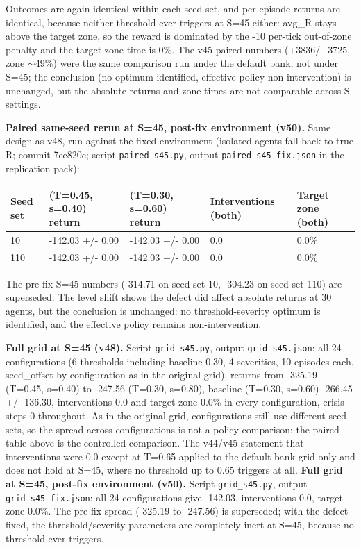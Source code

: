 \documentclass[11pt]{article}
\begin{document}
Outcomes are again identical within each seed set, and per-episode returns are identical, because neither threshold ever triggers at S=45 either: avg\_R stays above the target zone, so the reward is dominated by the -10 per-tick out-of-zone penalty and the target-zone time is 0\%. The v45 paired numbers (+3836/+3725, zone $\sim$49\%) were the same comparison run under the default bank, not under S=45; the conclusion (no optimum identified, effective policy non-intervention) is unchanged, but the absolute returns and zone times are not comparable across S settings.

\textbf{Paired same-seed rerun at S=45, post-fix environment (v50).} Same design as v48, run against the fixed environment (isolated agents fall back to true R; commit 7ee820c; script \texttt{paired\_s45.py}, output \texttt{paired\_s45\_fix.json} in the replication pack):

\begin{table}[htbp]
\centering
\begin{tabular}{lllll}
\toprule
\textbf{Seed set} & \textbf{(T=0.45, s=0.40) return} & \textbf{(T=0.30, s=0.60) return} & \textbf{Interventions (both)} & \textbf{Target zone (both)} \\
\midrule
10 & -142.03 +/- 0.00 & -142.03 +/- 0.00 & 0.0 & 0.0\% \\
110 & -142.03 +/- 0.00 & -142.03 +/- 0.00 & 0.0 & 0.0\% \\
\bottomrule
\end{tabular}
\end{table}

The pre-fix S=45 numbers (-314.71 on seed set 10, -304.23 on seed set 110) are superseded. The level shift shows the defect did affect absolute returns at 30 agents, but the conclusion is unchanged: no threshold-severity optimum is identified, and the effective policy remains non-intervention.

\textbf{Full grid at S=45 (v48).} Script \texttt{grid\_s45.py}, output \texttt{grid\_s45.json}: all 24 configurations (6 thresholds including baseline 0.30, 4 severities, 10 episodes each, seed\_offset by configuration as in the original grid), returns from -325.19 (T=0.45, s=0.40) to -247.56 (T=0.30, s=0.80), baseline (T=0.30, s=0.60) -266.45 +/- 136.30, interventions 0.0 and target zone 0.0\% in every configuration, crisis steps 0 throughout. As in the original grid, configurations still use different seed sets, so the spread across configurations is not a policy comparison; the paired table above is the controlled comparison. The v44/v45 statement that interventions were 0.0 except at T=0.65 applied to the default-bank grid only and does not hold at S=45, where no threshold up to 0.65 triggers at all. \textbf{Full grid at S=45, post-fix environment (v50).} Script \texttt{grid\_s45.py}, output \texttt{grid\_s45\_fix.json}: all 24 configurations give -142.03, interventions 0.0, target zone 0.0\%. The pre-fix spread (-325.19 to -247.56) is superseded; with the defect fixed, the threshold/severity parameters are completely inert at S=45, because no threshold ever triggers.
\end{document}
